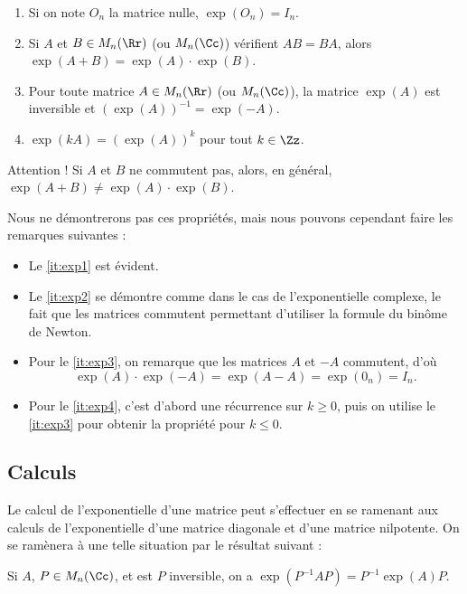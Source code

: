 \documentclass[12pt, class=report,crop=false]{standalone}
\begin{document}
\begin{proposition}
\sauteligne
\begin{enumerate}
  \item \label{it:exp1} Si on note $O_n$ la matrice nulle, $\exp(O_n)=I_n$.
  \item \label{it:exp2} Si $A$ et $B\in M_n(\Rr)$ (ou $M_n(\Cc)$) vérifient $AB=BA$, alors $\exp(A+B)=\exp(A) \cdot \exp(B)$.
  \item \label{it:exp3} Pour toute matrice $A\in M_n(\Rr)$ (ou $M_n(\Cc)$), la matrice $\exp(A)$ est inversible et $(\exp(A))^{-1}=\exp(-A)$.
  \item \label{it:exp4} $\exp (kA) = (\exp(A))^k$ pour tout $k\in \Zz$.  
\end{enumerate} 
\end{proposition}

\begin{remarque*}
Attention ! Si $A$ et $B$ ne commutent pas, alors, en général, $\exp (A+B) \neq \exp (A) \cdot \exp (B)$.
\end{remarque*}


Nous ne démontrerons pas ces propriétés, mais nous pouvons cependant faire 
les remarques suivantes :
\begin{itemize}
  \item Le \ref{it:exp1} est évident.
  \item Le \ref{it:exp2} se démontre comme dans le cas de l'exponentielle 
complexe, le fait que les matrices commutent permettant d'utiliser 
la formule du binôme de Newton.
  \item Pour le \ref{it:exp3}, on remarque que les 
matrices $A$ et $-A$ commutent, d'où $$\exp(A) \cdot \exp(-A) = \exp(A-A)=\exp(0_n)=I_n.$$ 
  \item Pour le \ref{it:exp4}, c'est d'abord une récurrence sur $k \ge 0$, puis on utilise le \ref{it:exp3} pour obtenir la propriété pour $k \le 0$.
\end{itemize}




\subsection{Calculs}

Le calcul de l'exponentielle d'une matrice peut s'effectuer en se ramenant aux calculs de l'exponentielle d'une matrice diagonale et d'une matrice nilpotente.
On se ramènera à une telle situation par le résultat suivant :
\begin{lemme}
Si $A$, $P\in M_n(\Cc)$, et est $P$ inversible, on a $\exp(P^{-1}AP)=P^{-1}\exp(A) P$.
\end{lemme}
\end{document}
